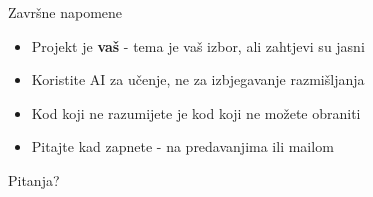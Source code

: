 \begin{frame}{Završne napomene}
\begin{itemize}
  \item Projekt je \textbf{vaš} - tema je vaš izbor, ali zahtjevi su jasni
  \item Koristite AI za učenje, ne za izbjegavanje razmišljanja
  \item Kod koji ne razumijete je kod koji ne možete obraniti
  \item Pitajte kad zapnete - na predavanjima ili mailom
\end{itemize}

\vspace{0.8em}
\begin{center}
\Large Pitanja?
\end{center}
\end{frame}


